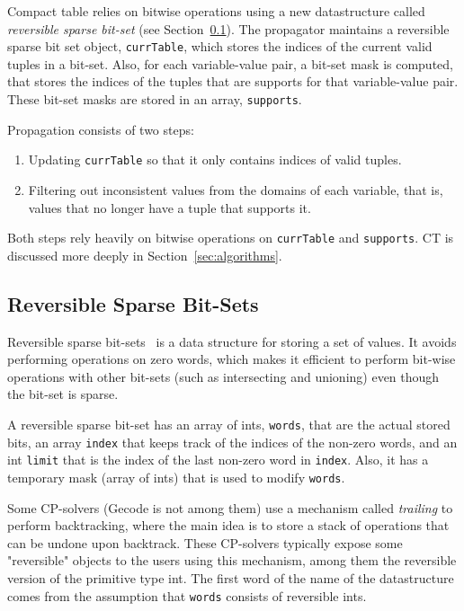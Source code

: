 \documentclass[a4paper,11pt]{article}
\newcommand{\T}[1]{\texttt{#1}}
\newcommand{\Secref}[1]{Section~\ref{#1}}
\newcommand{\CTpaper}[0]{DBLP:conf/cp/DemeulenaereHLP16}
\numberwithin{equation}{section}
\begin{document}
Compact table relies on bitwise operations using a new datastructure
called \emph{reversible sparse bit-set} (see \Secref{bg:sbs}).
The propagator maintains a reversible sparse bit set object, \texttt{currTable},
which stores the indices of the current valid tuples in a bit-set.
Also, for each variable-value pair, a bit-set mask is computed, that stores the
indices of the tuples that are supports for that variable-value pair.
These bit-set masks are stored in an array, \texttt{supports}.

Propagation consists of two steps:

\begin{enumerate}
  \item Updating \texttt{currTable} so that it only contains indices
    of valid tuples.
  \item Filtering out inconsistent values from the domains of each
    variable, that is,
    values that no longer have a tuple that supports it.
\end{enumerate}

Both steps rely heavily on bitwise operations on \T{currTable} and
\T{supports}. CT is discussed more deeply in \Secref{sec:algorithms}.

\subsection{Reversible Sparse Bit-Sets}
\label{bg:sbs}
Reversible sparse bit-sets~\cite{\CTpaper} 
is a data structure for storing 
a set of values. It avoids performing operations on zero
words, which makes it efficient to perform bit-wise operations
with other bit-sets (such as intersecting and unioning)
even though the bit-set is sparse.

A reversible sparse bit-set has an array of ints, \T{words},
that are the actual stored bits, an array \T{index} that
keeps track of the indices of the non-zero words, and an
int \T{limit} that is the index of the last non-zero word
in \T{index}. Also, it has a temporary mask (array of ints)
that is used to modify \T{words}.

Some CP-solvers (Gecode is not among them)
use a mechanism called \emph{trailing} to perform backtracking,
where the main idea is to store a stack of operations that can
be undone upon backtrack. These CP-solvers typically expose
some "reversible" objects to the users using this mechanism,
among them the reversible version of the primitive type int.
The first word of the name of the datastructure comes from
the assumption that \T{words} consists of
reversible ints.
\end{document}
